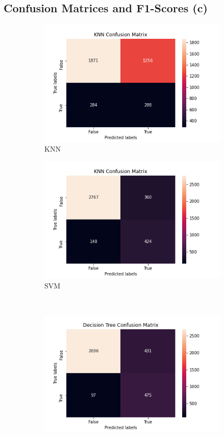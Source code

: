 \documentclass{article}
\begin{document}
\subsection{Confusion Matrices and F1-Scores (c)}

\begin{figure}[H]
\begin{subfigure}{.5\linewidth}
\centering
\includegraphics[scale=0.4]{KNN_under_confusionMatrix.png}
\caption{KNN}
\label{fig:knnMatrix_under}
\end{subfigure}%
\begin{subfigure}{.5\linewidth}
\centering
\includegraphics[scale=0.4]{SVM_under_confusionMatrix.png}
\caption{SVM}
\label{fig:svmMatrix_under}
\end{subfigure}\\[1ex]
\begin{subfigure}{.5\linewidth}
\centering
\includegraphics[scale=0.4]{DecisionTree_under_confusionMatrix.png}

\end{subfigure}
\end{figure}
\end{document}
